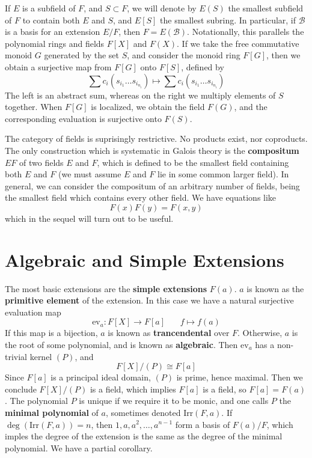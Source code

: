 If $E$ is a subfield of $F$, and $S \subset F$, we will denote by $E(S)$ the smallest subfield of $F$ to contain both $E$ and $S$, and $E[S]$ the smallest subring. In particular, if $\mathcal{B}$ is a basis for an extension $E/F$, then $F = E(\mathcal{B})$. Notationally, this parallels the polynomial rings and fields $F[X]$ and $F(X)$. If we take the free commutative monoid $G$ generated by the set $S$, and consider the monoid ring $F[G]$, then we obtain a surjective map from $F[G]$ onto $F[S]$, defined by
%
\[ \sum c_i (s_{i_1} \dots s_{i_{n_i}}) \mapsto \sum c_i (s_{i_1} \dots s_{i_{n_i}}) \]
%
The left is an abstract sum, whereas on the right we multiply elements of $S$ together. When $F[G]$ is localized, we obtain the field $F(G)$, and the corresponding evaluation is surjective onto $F(S)$.

The category of fields is suprisingly restrictive. No products exist, nor coproducts. The only construction which is systematic in Galois theory is the {\bf compositum} $EF$ of two fields $E$ and $F$, which is defined to be the smallest field containing both $E$ and $F$ (we must assume $E$ and $F$ lie in some common larger field). In general, we can consider the compositum of an arbitrary number of fields, being the smallest field which contains every other field. We have equations like
%
\[ F(x)F(y) = F(x,y) \]
%
which in the sequel will turn out to be useful.

\section{Algebraic and Simple Extensions}

The most basic extensions are the {\bf simple extensions} $F(a)$. $a$ is known as the {\bf primitive element} of the extension. In this case we have a natural surjective evaluation map
%
\[ \text{ev}_a: F[X] \to F[a]\ \ \ \ \ \ \ \ f \mapsto f(a) \]
%
If this map is a bijection, $a$ is known as {\bf trancendental} over $F$. Otherwise, $a$ is the root of some polynomial, and is known as {\bf algebraic}. Then $\text{ev}_a$ has a non-trivial kernel $(P)$, and
%
\[ F[X]/(P) \cong F[a] \]
%
Since $F[a]$ is a principal ideal domain, $(P)$ is prime, hence maximal. Then we conclude $F[X]/(P)$ is a field, which implies $F[a]$ is a field, so $F[a] = F(a)$. The polynomial $P$ is unique if we require it to be monic, and one calls $P$ the {\bf minimal polynomial} of $a$, sometimes denoted $\text{Irr}(F,a)$. If $\deg(\text{Irr}(F,a)) = n$, then $1, a, a^2, \dots, a^{n-1}$ form a basis of $F(a)/F$, which imples the degree of the extension is the same as the degree of the minimal polynomial. We have a partial corollary.

